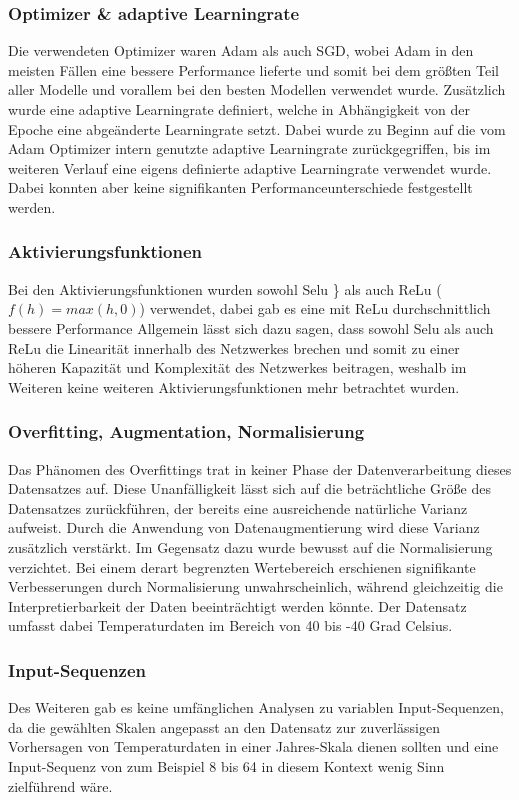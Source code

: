 \documentclass[acmtog, authorversion]{acmart} %
\begin{document}
\subsubsection{Optimizer \& adaptive Learningrate}
Die verwendeten Optimizer waren Adam als auch SGD, wobei Adam in den meisten Fällen eine bessere Performance lieferte und somit bei dem größten Teil aller Modelle und vorallem bei den besten Modellen verwendet wurde.
Zusätzlich wurde eine adaptive Learningrate definiert, welche in Abhängigkeit von der Epoche eine abgeänderte Learningrate setzt. Dabei wurde zu Beginn auf die vom Adam Optimizer intern genutzte adaptive Learningrate zurückgegriffen, bis im weiteren Verlauf eine eigens definierte adaptive Learningrate verwendet wurde. Dabei konnten aber keine signifikanten Performanceunterschiede festgestellt werden. 

\subsubsection{Aktivierungsfunktionen}
Bei den Aktivierungsfunktionen wurden sowohl Selu \} als auch ReLu ($f(h)=max(h,0)$) verwendet, dabei gab es eine mit ReLu durchschnittlich bessere Performance  Allgemein lässt sich dazu sagen, dass sowohl Selu als auch ReLu die Linearität innerhalb des Netzwerkes brechen und somit zu einer höheren Kapazität und Komplexität des Netzwerkes beitragen, weshalb im Weiteren keine weiteren Aktivierungsfunktionen mehr betrachtet wurden.


\subsubsection{Overfitting, Augmentation, Normalisierung} 
Das Phänomen des Overfittings trat in keiner Phase der Datenverarbeitung dieses Datensatzes auf. Diese Unanfälligkeit lässt sich auf die beträchtliche Größe des Datensatzes zurückführen, der bereits eine ausreichende natürliche Varianz aufweist. Durch die Anwendung von Datenaugmentierung wird diese Varianz zusätzlich verstärkt.
Im Gegensatz dazu wurde bewusst auf die Normalisierung verzichtet. Bei einem derart begrenzten Wertebereich erschienen signifikante Verbesserungen durch Normalisierung unwahrscheinlich, während gleichzeitig die Interpretierbarkeit der Daten beeinträchtigt werden könnte. Der Datensatz umfasst dabei Temperaturdaten im Bereich von 40 bis -40 Grad Celsius.
\subsubsection{Input-Sequenzen}
Des Weiteren gab es keine umfänglichen Analysen zu variablen Input-Sequenzen, da die gewählten Skalen angepasst an den Datensatz zur zuverlässigen Vorhersagen von Temperaturdaten in einer Jahres-Skala dienen sollten und eine Input-Sequenz von zum Beispiel 8 bis 64 in diesem Kontext wenig Sinn zielführend wäre.
\end{document}
